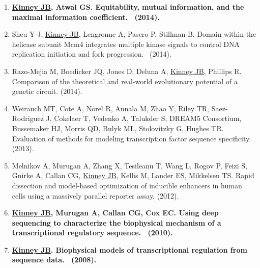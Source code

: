 \documentclass[10pt,hidelinks]{article}
\begin{document}
\begin{enumerate}
\item \textbf{\underline{Kinney JB}, Atwal GS. Equitability, mutual information, and the maximal information coefficient.\  (2014).}

\item Sheu Y-J, \underline{Kinney JB}, Lengronne A, Pasero P, Stillman B. Domain within the helicase subunit Mcm4 integrates multiple kinase signals to control DNA replication initiation and fork progression.\  (2014). 

\item Razo-Mejia M, Boedicker JQ, Jones D, Deluna A, \underline{Kinney JB}, Phillips R. Comparison of the theoretical and real-world evolutionary potential of a genetic circuit.  (2014). 
 
\item Weirauch MT, Cote A, Norel R, Annala M, Zhao Y, Riley TR, Saez-Rodriguez J, Cokelaer T, Vedenko A, Talukder S, DREAM5 Consortium, Bussemaker HJ, Morris QD, Bulyk ML, Stolovitzky G, Hughes TR.  Evaluation of methods for modeling transcription factor sequence specificity.\  (2013).

\item Melnikov A, Murugan A, Zhang X, Tesileanu T, Wang L, Rogov P, Feizi S, Gnirke A, Callan CG, \underline{Kinney JB}, Kellis M, Lander ES, Mikkelsen TS.  Rapid dissection and model-based optimization of inducible enhancers in human cells using a massively parallel reporter assay.  (2012).

\item \textbf{\underline{Kinney JB}, Murugan A, Callan CG, Cox EC. Using deep sequencing to characterize the biophysical mechanism of a transcriptional regulatory sequence.\  (2010).}

\item \textbf{\underline{Kinney JB}. Biophysical models of transcriptional regulation from sequence data.\  (2008).}


\end{enumerate}
\end{document}
